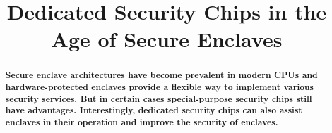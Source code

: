 

\graphicspath{{images/}}

\title{Dedicated Security Chips in the Age of Secure Enclaves} 


\maketitle
\thispagestyle{empty}

\begin{abstract}
\bfseries
Secure enclave architectures have become prevalent in modern CPUs and hardware-protected enclaves provide a flexible way to implement various security services. But in certain cases special-purpose security chips still have advantages. Interestingly, dedicated security chips can also assist enclaves in their operation and improve the security of enclaves.
\end{abstract}












